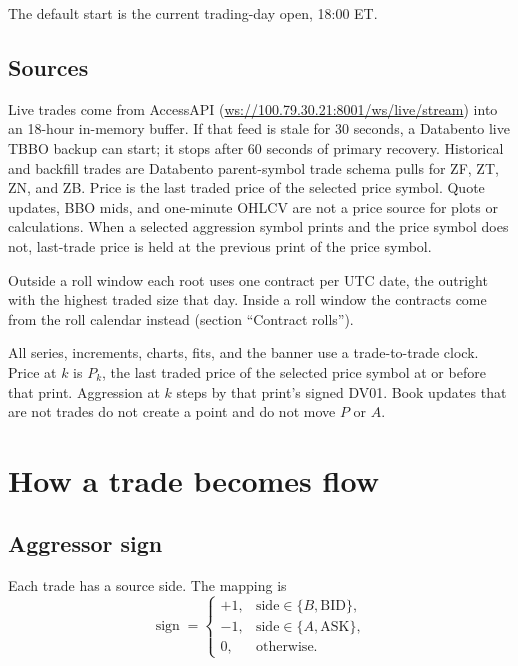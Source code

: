 \documentclass[11pt]{article}
\begin{document}
The default start is the current trading-day open, 18:00 ET.

\subsection{Sources}

Live trades come from AccessAPI (\url{ws://100.79.30.21:8001/ws/live/stream}) into an 18-hour in-memory buffer. If that feed is stale for 30 seconds, a Databento live TBBO backup can start; it stops after 60 seconds of primary recovery. Historical and backfill trades are Databento parent-symbol trade schema pulls for ZF, ZT, ZN, and ZB. Price is the last traded price of the selected price symbol. Quote updates, BBO mids, and one-minute OHLCV are not a price source for plots or calculations. When a selected aggression symbol prints and the price symbol does not, last-trade price is held at the previous print of the price symbol.

Outside a roll window each root uses one contract per UTC date, the outright with the highest traded size that day. Inside a roll window the contracts come from the roll calendar instead (section ``Contract rolls'').



All series, increments, charts, fits, and the banner use a trade-to-trade clock. Price at $k$ is $P_k$, the last traded price of the selected price symbol at or before that print. Aggression at $k$ steps by that print's signed DV01. Book updates that are not trades do not create a point and do not move $P$ or $A$.


\section{How a trade becomes flow}

\subsection{Aggressor sign}

Each trade has a source side. The mapping is
\begin{equation}
\operatorname{sign}=
\begin{cases}
+1, & \text{side}\in\{B,\mathrm{BID}\},\\
-1, & \text{side}\in\{A,\mathrm{ASK}\},\\
0, & \text{otherwise}.
\end{cases}
\end{equation}
\end{document}

